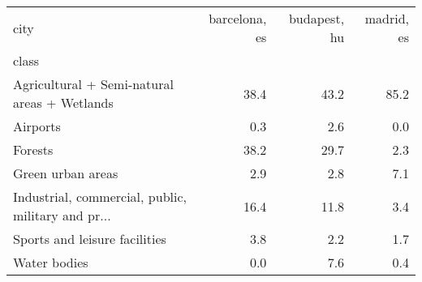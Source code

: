 \begin{tabular}{lrrr}
\toprule
city &  barcelona, es &  budapest, hu &  madrid, es \\
class                                              &                &               &             \\
\midrule
Agricultural + Semi-natural areas + Wetlands       &           38.4 &          43.2 &        85.2 \\
Airports                                           &            0.3 &           2.6 &         0.0 \\
Forests                                            &           38.2 &          29.7 &         2.3 \\
Green urban areas                                  &            2.9 &           2.8 &         7.1 \\
Industrial, commercial, public, military and pr... &           16.4 &          11.8 &         3.4 \\
Sports and leisure facilities                      &            3.8 &           2.2 &         1.7 \\
Water bodies                                       &            0.0 &           7.6 &         0.4 \\
\bottomrule
\end{tabular}
